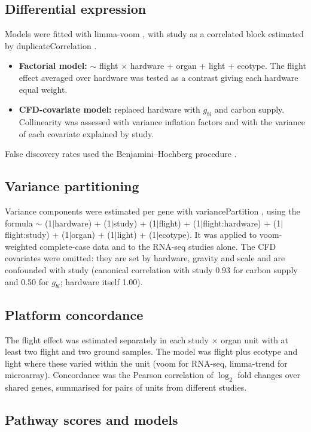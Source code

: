 \documentclass[11pt,a4paper]{article}
\begin{document}
\subsection*{Differential expression}

Models were fitted with limma-voom \citep{law2014,smyth2005}, with study as a correlated block estimated by duplicateCorrelation \citep{smyth2005b}.
\begin{itemize}
    \item \textbf{Factorial model:} $\sim$ flight $\times$ hardware + organ + light + ecotype. The flight effect averaged over hardware was tested as a contrast giving each hardware equal weight.
    \item \textbf{CFD-covariate model:} replaced hardware with $g_{bl}$ and carbon supply. Collinearity was assessed with variance inflation factors and with the variance of each covariate explained by study.
\end{itemize}
False discovery rates used the Benjamini--Hochberg procedure \citep{benjamini1995}.

\subsection*{Variance partitioning}

Variance components were estimated per gene with variancePartition \citep{hoffman2016}, using the formula $\sim$ (1$|$hardware) + (1$|$study) + (1$|$flight) + (1$|$flight:hardware) + (1$|$flight:study) + (1$|$organ) + (1$|$light) + (1$|$ecotype). It was applied to voom-weighted complete-case data and to the RNA-seq studies alone. The CFD covariates were omitted: they are set by hardware, gravity and scale and are confounded with study (canonical correlation with study 0.93 for carbon supply and 0.50 for $g_{bl}$; hardware itself 1.00).

\subsection*{Platform concordance}

The flight effect was estimated separately in each study $\times$ organ unit with at least two flight and two ground samples. The model was flight plus ecotype and light where these varied within the unit (voom for RNA-seq, limma-trend for microarray). Concordance was the Pearson correlation of $\log_2$ fold changes over shared genes, summarised for pairs of units from different studies.

\subsection*{Pathway scores and models}
\end{document}
